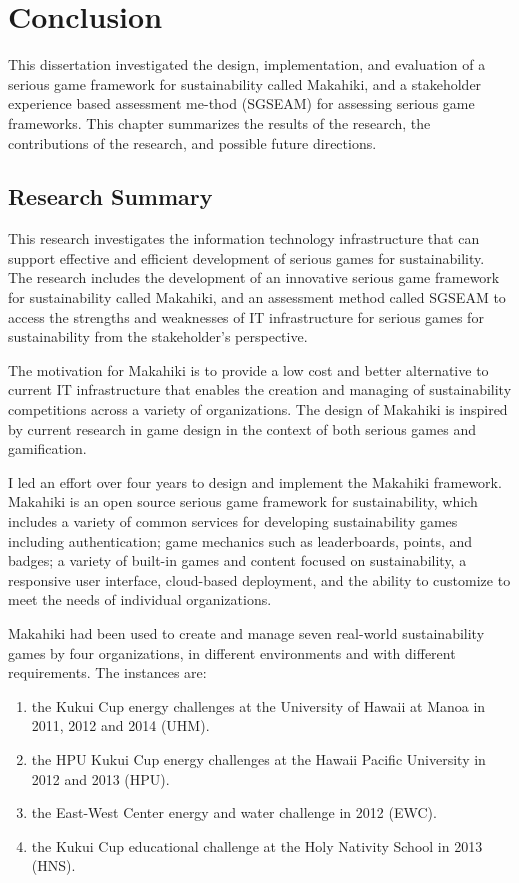\chapter{Conclusion}
\label{cha:conclusion}

This dissertation investigated the design, implementation, and evaluation of a serious game framework for sustainability called Makahiki, and a stakeholder experience based assessment me-thod (SGSEAM) for assessing serious game frameworks. This chapter summarizes the results of the research, the contributions of the research, and possible future directions.

\section{Research Summary}

This research investigates the information technology infrastructure that can support effective and efficient development of serious games for sustainability. The research includes the development of an innovative serious game framework for sustainability called Makahiki, and an assessment method called SGSEAM to access the strengths and weaknesses of IT infrastructure for serious games for sustainability from the stakeholder's perspective.

The motivation for Makahiki is to provide a low cost and better alternative to current IT infrastructure that enables the creation and managing of sustainability competitions across a variety of organizations. The design of Makahiki is inspired by current research in game design in the context of both serious games and gamification. 

I led an effort over four years to design and implement the Makahiki framework. Makahiki is an open source serious game framework for sustainability, which includes a variety of common services for developing sustainability games including authentication; game mechanics such as leaderboards, points, and badges; a variety of built-in games and content focused on sustainability, a responsive user interface, cloud-based deployment, and the ability to customize to meet the needs of individual organizations.

Makahiki had been used to create and manage seven real-world sustainability games by four organizations, in different environments and with different requirements. The instances are: 
\begin{enumerate}
\item the Kukui Cup energy challenges at the University of Hawaii at Manoa in 2011, 2012 and 2014 (UHM).
\item the HPU Kukui Cup energy challenges at the Hawaii Pacific University in 2012 and 2013 (HPU).
\item the East-West Center energy and water challenge in 2012 (EWC).
\item the Kukui Cup educational challenge at the Holy Nativity School in 2013 (HNS). 
\end{enumerate}

